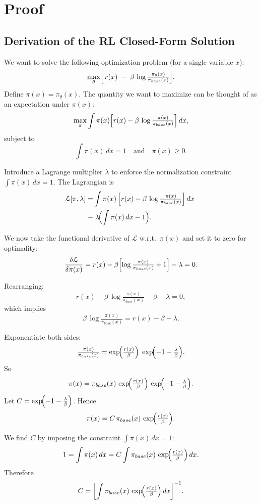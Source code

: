 \section{Proof}

\subsection{Derivation of the RL Closed-Form Solution}
\label{proof-rl}

We want to solve the following optimization problem (for a single variable \(x\)):
\[
\max_{\theta} \Bigl[\,r(x)\;-\;\beta \,\log \tfrac{\pi_{\theta}(x)}{\pi_{base}(x)}\Bigr].
\]
Define \(\pi(x) = \pi_{\theta}(x)\). The quantity we want to maximize can be thought of as an expectation under \(\pi(x)\):
\[
\max_{\pi} \int \pi(x) \Bigl[r(x) - \beta\,\log \tfrac{\pi(x)}{\pi_{base}(x)}\Bigr] \, dx,
\]
subject to
\[
\int \pi(x)\, dx = 1 \quad\text{and}\quad \pi(x) \ge 0.
\]

Introduce a Lagrange multiplier \(\lambda\) to enforce the normalization constraint \(\int \pi(x)\,dx = 1\). The Lagrangian is
\begin{equation}
\begin{split}
    \mathcal{L}[\pi, \lambda] 
= &\int \pi(x)\,\Bigl[r(x) - \beta\,\log \tfrac{\pi(x)}{\pi_{base}(x)}\Bigr]\,dx 
\;\\- &\;\lambda\!\Bigl(\int \pi(x)\,dx - 1\Bigr). \nonumber
\end{split}
\end{equation}

We now take the functional derivative of \(\mathcal{L}\) w.r.t.\ \(\pi(x)\) and set it to zero for optimality:
\[
\frac{\delta \mathcal{L}}{\delta \pi(x)} 
= r(x) 
- \beta \Bigl[\log \tfrac{\pi(x)}{\pi_{base}(x)} + 1 \Bigr]
- \lambda 
= 0.
\]

Rearranging:
\[
r(x) - \beta \,\log \tfrac{\pi(x)}{\pi_{base}(x)} - \beta - \lambda = 0,
\]
which implies
\[
\beta \,\log \tfrac{\pi(x)}{\pi_{base}(x)} = r(x) - \beta - \lambda.
\]

Exponentiate both sides:
\[
\tfrac{\pi(x)}{\pi_{base}(x)} 
= \exp\!\Bigl(\tfrac{r(x)}{\beta}\Bigr) \;\exp\!\Bigl(- 1 - \tfrac{\lambda}{\beta}\Bigr).
\]
So
\[
\pi(x) 
= \pi_{base}(x)\,\exp\!\Bigl(\tfrac{r(x)}{\beta}\Bigr)\,\exp\!\Bigl(-1 - \tfrac{\lambda}{\beta}\Bigr).
\]
Let $C = \exp\!\Bigl(-1 - \tfrac{\lambda}{\beta}\Bigr)$.
Hence
\[
\pi(x) = C\,\pi_{base}(x)\,\exp\!\Bigl(\tfrac{r(x)}{\beta}\Bigr).
\]

We find \(C\) by imposing the constraint \(\int \pi(x)\,dx = 1\):
\[
1 
= \int \pi(x)\,dx 
= C \int \pi_{base}(x)\,\exp\!\Bigl(\tfrac{r(x)}{\beta}\Bigr)\,dx.
\]
Therefore
\[
C 
= \biggl[\int \pi_{base}(x)\,\exp\!\Bigl(\tfrac{r(x)}{\beta}\Bigr)\,dx \biggr]^{-1}.
\]

